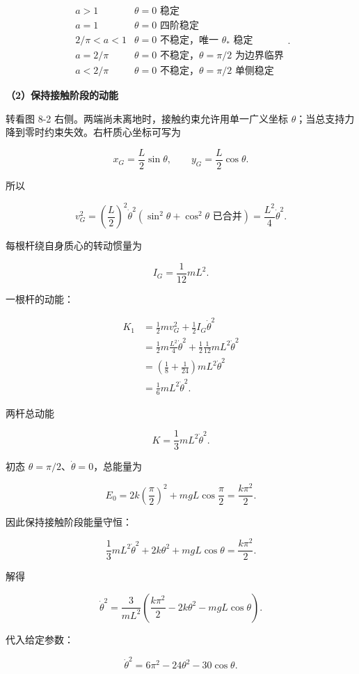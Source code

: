 \documentclass[12pt,a4paper,UTF8]{ctexart}
\begin{document}
\[\boxed{
\begin{array}{c|c}
a>1 & \theta=0\text{ 稳定}\\
a=1 & \theta=0\text{ 四阶稳定}\\
2/\pi<a<1 & \theta=0\text{ 不稳定，唯一 }\theta_*\text{ 稳定}\\
a=2/\pi & \theta=0\text{ 不稳定，}\theta=\pi/2\text{ 为边界临界}\\
a<2/\pi & \theta=0\text{ 不稳定，}\theta=\pi/2\text{ 单侧稳定}
\end{array}
}.\]

\textbf{（2）保持接触阶段的动能}

转看图 8-2 右侧。两端尚未离地时，接触约束允许用单一广义坐标
\(\theta\)；当总支持力降到零时约束失效。右杆质心坐标可写为

\[x_G=\frac L2\sin\theta,\qquad y_G=\frac L2\cos\theta.\]

所以

\[v_G^2=\left(\frac L2\right)^2\dot\theta^2
(\sin^2\theta+\cos^2\theta\text{ 已合并})
=\frac{L^2}{4}\dot\theta^2.\]

每根杆绕自身质心的转动惯量为

\[I_G=\frac1{12}mL^2.\]

一根杆的动能：

\[\begin{aligned}
K_1
&=\frac12mv_G^2+\frac12I_G\dot\theta^2\\
&=\frac12m\frac{L^2}{4}\dot\theta^2
+\frac12\frac1{12}mL^2\dot\theta^2\\
&=\left(\frac18+\frac1{24}\right)mL^2\dot\theta^2\\
&=\frac16mL^2\dot\theta^2.
\end{aligned}\]

两杆总动能

\[\boxed{K=\frac13mL^2\dot\theta^2}.\]

初态 \(\theta=\pi/2\)、\(\dot\theta=0\)，总能量为

\[E_0=2k\left(\frac\pi2\right)^2+mgL\cos\frac\pi2
=\frac{k\pi^2}{2}.\]

因此保持接触阶段能量守恒：

\[\frac13mL^2\dot\theta^2+2k\theta^2+mgL\cos\theta
=\frac{k\pi^2}{2}.\]

解得

\[\boxed{
\dot\theta^2=\frac{3}{mL^2}\left(
\frac{k\pi^2}{2}-2k\theta^2-mgL\cos\theta
\right)
}.\]

代入给定参数：

\[\boxed{
\dot\theta^2=6\pi^2-24\theta^2-30\cos\theta
}.\]
\end{document}

